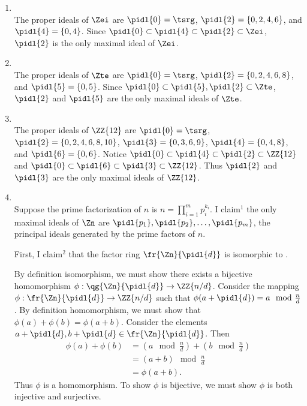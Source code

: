 \documentclass{article}
\begin{document}
\begin{solution} %
\begin{enumerate}[label=\bd{\alph*.}]
  \item \Zei \\
    The proper ideals of \( \Zei \) are \( \pidl{0} = \tsrg \), \( \pidl{2} = \{0,2,4,6\}\), and \(\pidl{4} = \{0,4\}\).
    Since \( \pidl{0}\subset \pidl{4}\subset \pidl{2} \subset \Zei\), \( \pidl{2} \) is the only maximal ideal of \( \Zei \).
  \item \Zte \\
    The proper ideals of \( \Zte \) are \( \pidl{0} = \tsrg \), \( \pidl{2} = \{0,2,4,6,8\} \), and \( \pidl{5} = \{0,5\} \).
    Since \( \pidl{0}\subset \pidl{5}, \pidl{2} \subset \Zte \), \( \pidl{2} \) and \( \pidl{5} \) are the only maximal ideals of \( \Zte \).
  \item {} \\
    The proper ideals of \( \ZZ{12} \) are \( \pidl{0} = \tsrg \), \( \pidl{2} = \{0,2,4,6,8,10\} \), \( \pidl{3}=\{0,3,6,9\} \), \( \pidl{4}=\{0,4,8\} \), and \( \pidl{6}=\{0,6\} \).
    Notice \( \pidl{0}\subset\pidl{4} \subset \pidl{2} \subset \ZZ{12} \) and \( \pidl{0}\subset\pidl{6} \subset \pidl{3} \subset \ZZ{12} \). Thus \( \pidl{2} \) and \( \pidl{3} \) are the only maximal ideals of \( \ZZ{12} \).
  \item \Zn \\
    Suppose the prime factorization of \( n \) is \( n=\prod_{i=1}^{m} p_i^{k_i} \).
    I claim\( ^1 \) the only maximal ideals of \( \Zn \) are \( \pidl{p_1}, \pidl{p_2}, \ldots, \pidl{p_m} \), the principal ideals generated by the prime factors of \( n \).
    \begin{subproof}[Claim 1]
      First, I claim\( ^2 \) that the factor ring \( \fr{\Zn}{\pidl{d}} \) is isomorphic to .
      \begin{subproof}[Claim 2]
        By definition isomorphism, we must show there exists a bijective homomorphism \( \phi:\qg{\Zn}{\pidl{d}}\to \ZZ{n/d} \). Consider the mapping \( \phi:\fr{\Zn}{\pidl{d}}\to\ZZ{n/d} \) such that \(\phi(a+\pidl{d}) = a\mod{\frac{n}{d}} \).
        By definition homomorphism, we must show that \( \phi(a)+\phi(b) = \phi(a+b) \). Consider the elements \( a+\pidl{d}, b+\pidl{d}\in\fr{\Zn}{\pidl{d}} \). Then \begin{align*}
          \phi(a)+\phi(b) &= \left(a\mod{\frac{n}{d}}\right) + \left(b\mod{\frac{n}{d}}\right) \\
          &= (a+b)\mod{\frac{n}{d}} \\
          &= \phi(a+b).
        \end{align*}
        Thus \( \phi \) is a homomorphism. To show \( \phi \) is bijective, we must show \( \phi \) is both injective and surjective.


\end{subproof}
\end{subproof}
\end{enumerate}
\end{solution}
\end{document}
